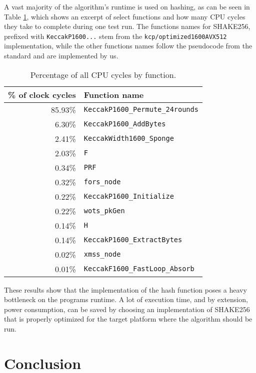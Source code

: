 \documentclass[journal=tosc,notanonymous]{iacrtrans}
\begin{document}
A vast majority of the algorithm's runtime is used on hashing, as can be seen in Table \ref{tab:perf}, which shows an excerpt of select functions and how many CPU cycles they take to complete during one test run.
The functions names for SHAKE256, prefixed with \texttt{KeccakP1600...} stem from the \texttt{kcp/optimized1600AVX512} implementation, while the other functions names follow the pseudocode from the standard and are implemented by us.

\begin{table}[ht]
\centering
\begin{tabular}{ r | l }
    \textbf{\% of clock cycles} & \textbf{Function name} \\
    \hline
    85.93\% & \texttt{KeccakP1600\_Permute\_24rounds} \\
     6.30\% & \texttt{KeccakP1600\_AddBytes} \\
     2.41\% & \texttt{KeccakWidth1600\_Sponge} \\
     2.03\% & \texttt{F} \\
     0.34\% & \texttt{PRF} \\
     0.32\% & \texttt{fors\_node} \\
     0.22\% & \texttt{KeccakP1600\_Initialize} \\
     0.22\% & \texttt{wots\_pkGen} \\
     0.14\% & \texttt{H} \\
     0.14\% & \texttt{KeccakP1600\_ExtractBytes} \\
     0.02\% & \texttt{xmss\_node} \\
     0.01\% & \texttt{KeccakF1600\_FastLoop\_Absorb}
\end{tabular}
     \caption{\label{tab:perf}Percentage of all CPU cycles by function.}
\end{table}

These results show that the implementation of the hash function poses a heavy bottleneck on the programs runtime.
A lot of execution time, and by extension, power consumption, can be saved by choosing an implementation of SHAKE256 that is properly optimized for the target platform where the algorithm should be run.

\section{Conclusion}
\end{document}
